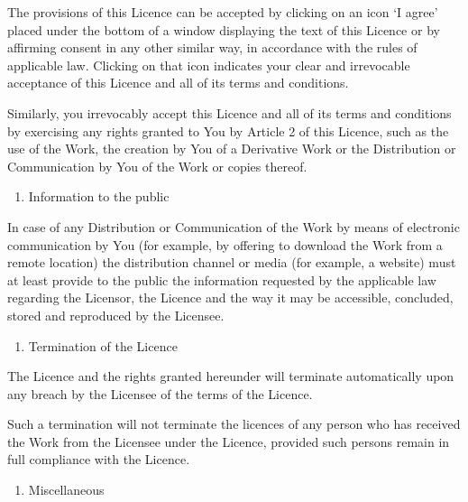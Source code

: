 \documentclass[letterpaper,10pt,english]{sphinxmanual}
\begin{document}
\sphinxAtStartPar
The provisions of this Licence can be accepted by clicking on an icon ‘I agree’
placed under the bottom of a window displaying the text of this Licence or by
affirming consent in any other similar way, in accordance with the rules of
applicable law. Clicking on that icon indicates your clear and irrevocable
acceptance of this Licence and all of its terms and conditions.

\sphinxAtStartPar
Similarly, you irrevocably accept this Licence and all of its terms and
conditions by exercising any rights granted to You by Article 2 of this Licence,
such as the use of the Work, the creation by You of a Derivative Work or the
Distribution or Communication by You of the Work or copies thereof.
\begin{enumerate}
%
\setcounter{enumi}{10}
\item {} 
\sphinxAtStartPar
Information to the public

\end{enumerate}

\sphinxAtStartPar
In case of any Distribution or Communication of the Work by means of electronic
communication by You (for example, by offering to download the Work from a
remote location) the distribution channel or media (for example, a website) must
at least provide to the public the information requested by the applicable law
regarding the Licensor, the Licence and the way it may be accessible, concluded,
stored and reproduced by the Licensee.
\begin{enumerate}
%
\setcounter{enumi}{11}
\item {} 
\sphinxAtStartPar
Termination of the Licence

\end{enumerate}

\sphinxAtStartPar
The Licence and the rights granted hereunder will terminate automatically upon
any breach by the Licensee of the terms of the Licence.

\sphinxAtStartPar
Such a termination will not terminate the licences of any person who has
received the Work from the Licensee under the Licence, provided such persons
remain in full compliance with the Licence.
\begin{enumerate}
%
\setcounter{enumi}{12}
\item {} 
\sphinxAtStartPar
Miscellaneous

\end{enumerate}
\end{document}
